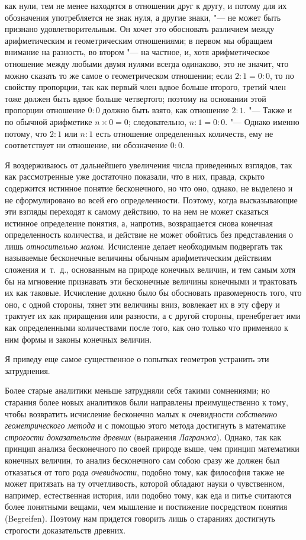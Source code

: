 как нули, тем не менее находятся в отношении друг к другу, и потому для их
обозначения употребляется не знак нуля, а другие знаки, "--- не может быть
признано удовлетворительным. Он хочет это обосновать различием между
арифметическим и геометрическим отношениями; в первом мы обращаем внимание
на разность, во втором "--- на частное, и, хотя арифметическое отношение между
любыми двумя нулями всегда одинаково, это не значит, что можно сказать то
же самое о геометрическом отношении; если $2 : 1 = 0 : 0$,
то по свойству пропорции, так как первый член вдвое больше второго, третий
член тоже должен быть вдвое больше четвертого; поэтому на основании этой
пропорции отношение $0 : 0$ должно быть взято, как отношение
$2 : 1$. "--- Также и по обычной арифметике $n \times 0 = 0$; следовательно,
$n : 1 = 0 : 0$. "--- Однако именно потому, что $2 : 1$ или $n : 1$
есть отношение определенных количеств, ему не соответствует ни отношение,
ни обозначение $0 : 0$.

Я воздерживаюсь от дальнейшего увеличения числа приведенных взглядов, так
как рассмотренные уже достаточно показали, что в них, правда, скрыто
содержится истинное понятие бесконечного, но что оно, однако, не выделено и
не сформулировано во всей его определенности. Поэтому, когда высказывающие
эти взгляды переходят к самому действию, то на нем не может сказаться
истинное определение понятия, а, напротив, возвращается снова конечная
определенность количества, и действие не может обойтись без представления о
лишь {\em относительно малом}. Исчисление делает
необходимым подвергать так называемые бесконечные величины обычным
арифметическим действиям сложения и~т.~д., основанным на природе конечных
величин, и тем самым хотя бы на мгновение признавать эти бесконечные
величины конечными и трактовать их как таковые. Исчисление должно было бы
обосновать правомерность того, что оно, с одной стороны, тянет эти величины
вниз, вовлекает их в эту сферу и трактует их как приращения или разности, а
с другой стороны, пренебрегает ими как определенными количествами после
того, как оно только что применяло к ним формы и законы конечных величин.

Я приведу еще самое существенное о попытках геометров устранить эти
затруднения.

Более старые аналитики меньше затрудняли себя такими сомнениями; но старания
более новых аналитиков были направлены преимущественно к тому, чтобы
возвратить исчисление бесконечно малых к очевидности
{\em собственно геометрического метода} и с помощью
этого метода достигнуть в математике {\em строгости
доказательств древних} (выражения {\em Лагранжа}).
Однако, так как принцип анализа бесконечного по своей природе выше, чем
принцип математики конечных величин, то анализ бесконечного сам собою сразу
же должен был отказаться от того рода
{\em очевидности}, подобно тому, как философия также не
может притязать на ту отчетливость, которой обладают науки о чувственном,
например, естественная история, или подобно тому, как еда и питье считаются
более понятными вещами, чем мышление и постижение посредством понятия
(Begreifen). Поэтому нам придется говорить лишь о стараниях достигнуть
строгости доказательств древних.

